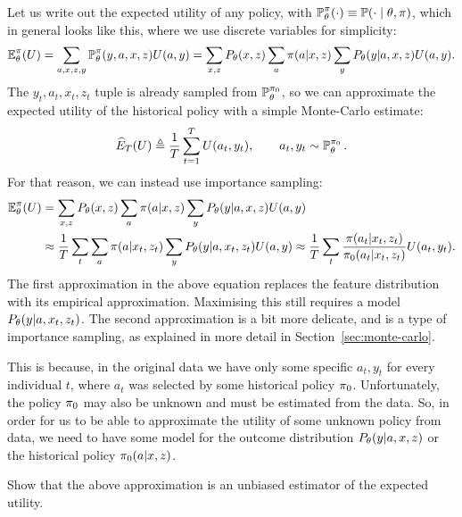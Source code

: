 {  Let us write out the expected utility of any policy, with $\mathop{\mbox{\ensuremath{\mathbb{P}}}}\nolimits_\theta^{\pi}(\cdot) \equiv \mathop{\mbox{\ensuremath{\mathbb{P}}}}\nolimits(\cdot \mid \theta, \pi)$, which in general looks like this, where we use discrete variables for simplicity:
  \[
    \mathop{\mbox{\ensuremath{\mathbb{E}}}}\nolimits_\theta^\pi(U) = \sum_{a,x,z,y} \mathop{\mbox{\ensuremath{\mathbb{P}}}}\nolimits_\theta^\pi(y,a,x,z) U(a,y) = \sum_{x,z} P_\theta(x,z) \sum_a \pi(a | x, z) \sum_y P_\theta(y | a, x, z) U(a,y).
  \]
  The $y_t, a_t, x_t, z_t$ tuple is already sampled from $\mathop{\mbox{\ensuremath{\mathbb{P}}}}\nolimits_\theta^{\pi_0}$, so we can approximate the expected utility of the \alert{historical policy} with a simple Monte-Carlo estimate:
  \[
    \widehat{E}_T(U) \mathrel{\triangleq} \frac{1}{T} \sum_{t=1}^T U(a_t,y_t), \qquad a_t, y_t \sim \mathop{\mbox{\ensuremath{\mathbb{P}}}}\nolimits_\theta^{\pi_0}.
  \]
  For that reason, we can instead use importance sampling:
  \begin{align*}
    \mathop{\mbox{\ensuremath{\mathbb{E}}}}\nolimits^\pi_\theta(U)
    &=
      \sum_{x,z} P_\theta(x, z) \sum_a \pi(a | x, z) \sum_y P_\theta(y | a, x, z) U(a,y) \\
    &\approx
      \frac{1}{T} \sum_{t} \sum_a \pi(a | x_t, z_t) \sum_y P_\theta(y | a, x_t, z_t) U(a,y)
      \approx
      \frac{1}{T} \sum_{t} \frac{\pi(a_t | x_t, z_t)}{\pi_0(a_t | x_t, z_t)} U(a_t,y_t).
  \end{align*}
  The first approximation in the above equation replaces the feature distribution with its empirical approximation. Maximising this still requires a model $P_\theta(y | a, x_t, z_t)$.
  The second approximation is a bit more delicate, and is a type of importance sampling, as explained in more detail in Section~\ref{sec:monte-carlo}.

  This is because, in the original data we have only some specific $a_t, y_t$ for every individual $t$, where $a_t$ was selected by some historical policy $\pi_0$. Unfortunately, the policy $\pi_0$ may also be unknown and must be estimated from the data. So, in order for us to be able to approximate the utility of some unknown policy from data, we need to have some model for the outcome distribution $P_\theta(y | a, x, z)$ or the historical policy $\pi_0(a | x, z)$.

    \begin{exercise}
    Show that the above approximation is an unbiased estimator of the expected utility.
  \end{exercise}
  
}
